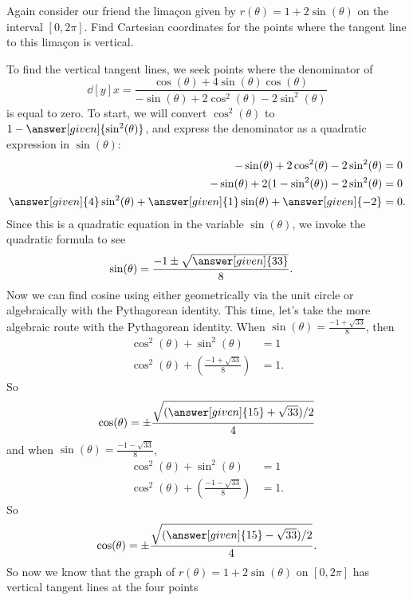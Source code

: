 \documentclass{ximera}
\begin{document}
\begin{example}
  Again consider our friend the lima\c{c}on given by $r(\theta)
  =1+2\sin(\theta)$ on the interval $[0,2\pi]$.  Find Cartesian
  coordinates for the points where the tangent line to this lima\c{c}on
  is vertical.
  \begin{explanation}
    To find the vertical tangent lines, we seek points where the
    denominator of
    \[
    \dd[y]{x}=\frac{\cos(\theta) + 4\sin(\theta)\cos(\theta)}{-\sin(\theta) + 2\cos^2(\theta)-2\sin^2(\theta)}
    \]
    is equal to zero.  To start, we will convert $\cos^2(\theta)$ to
    $1-\answer[given]{\sin^2(\theta)}$, and express the denominator as a quadratic
    expression in $\sin(\theta)$:
  \begin{align*}
    -\sin(\theta) + 2\cos^2(\theta)-2\sin^2(\theta) &=0\\
    -\sin(\theta) + 2(1-\sin^2(\theta))-2\sin^2(\theta) &=0\\
    \answer[given]{4} \sin^2(\theta) + \answer[given]{1}\sin(\theta) + \answer[given]{-2} &= 0.
  \end{align*}
  Since this is a quadratic equation in the variable $\sin(\theta)$,
  we invoke the quadratic formula to see
  \begin{align*}
    \sin(\theta) &= \frac{-1\pm\sqrt{\answer[given]{33}}}{8}.
  \end{align*}
  Now we can find cosine using either geometrically via the unit circle or algebraically with the Pythagorean
  identity.  This time, let's take the more algebraic route with the Pythagorean identity. When $\sin(\theta) =\frac{-1+\sqrt{33}}{8}$, then
  \begin{align*}
    \cos^2(\theta) + \sin^2(\theta) &= 1\\
    \cos^2(\theta) + \left(\frac{-1+\sqrt{33}}{8}\right) &= 1.
  \end{align*}
  So
  \[
  \cos(\theta) = \pm \frac{\sqrt{(\answer[given]{15}+\sqrt{33})/2}}{4}
  \]
  and when $\sin(\theta) =\frac{-1-\sqrt{33}}{8}$,
  \begin{align*}
    \cos^2(\theta) + \sin^2(\theta) &= 1\\
    \cos^2(\theta) + \left(\frac{-1-\sqrt{33}}{8}\right) &= 1.
  \end{align*}
  So
  \[
  \cos(\theta) = \pm \frac{\sqrt{(\answer[given]{15}-\sqrt{33})/2}}{4}.
  \]
  So now we know that the graph of $r(\theta) =1+2\sin(\theta)$ on
  $[0,2\pi]$ has vertical tangent lines at the four points
   \begin{image}
      \begin{tikzpicture}

\end{tikzpicture}
\end{image}
\end{explanation}
\end{example}
\end{document}
